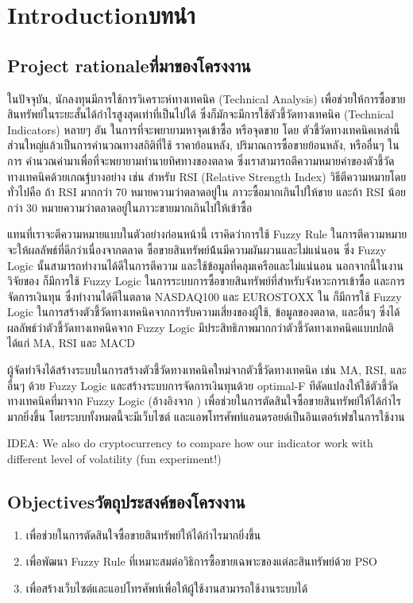 \chapter{\ifenglish Introduction\else บทนำ\fi}

\section{\ifenglish Project rationale\else ที่มาของโครงงาน\fi}
ในปัจจุบัน, นักลงทุนมีการใช้การวิเคราะห์ทางเทคนิค (Technical Analysis) เพื่อช่วยให้การซื้อขายสินทรัพย์ในระยะสั้นได้กำไรสูงสุดเท่าที่เป็นไปได้
ซึ่งก็มักจะมีการใช้ตัวชี้วัดทางเทคนิค (Technical Indicators) หลายๆ อัน ในการที่จะพยายามหาจุดเข้าซื้อ หรือจุดขาย โดย 
ตัวชี้วัดทางเทคนิคเหล่านี้ส่วนใหญ่แล้วเป็นการคำนวณทางสถิติที่ใช้ ราคาย้อนหลัง, ปริมาณการซื้อขายย้อนหลัง, หรืออื่นๆ ในการ
คำนวณค่ามาเพื่อที่จะพยายามทำนายทิศทางของตลาด ซึ่งเราสามารถตีความหมายค่าของตัวชี้วัดทางเทคนิคด้วยเกณฐ์บางอย่าง เช่น 
สำหรับ RSI (Relative Strength Index) วิธีตีความหมายโดยทั่วไปคือ ถ้า RSI มากกว่า 70 หมายความว่าตลาดอยู่ใน
ภาวะซื้อมากเกินไปให้ขาย และถ้า RSI น้อยกว่า 30 หมายความว่าตลาดอยู่ในภาวะขายมากเกินไปให้เข้าซื้อ

แทนที่เราจะตีความหมายแบบในตัวอย่างก่อนหน้านี้ เราคิดว่าการใช้ Fuzzy Rule ในการตีความหมายจะให้ผลลัพธ์ที่ดีกว่าเนื่องจากตลาด
ซื้อขายสินทรัพย์น้้นมีความผันผวนและไม่แน่นอน ซึ่ง Fuzzy Logic นั้นสามารถทำงานได้ดีในการตีความ และใช้ข้อมูลที่คลุมเครือและไม่แน่นอน
นอกจากนี้ในงานวิจัยของ \cite{Rodrigo} ก็มีการใช้ Fuzzy Logic ในการระบบการซื้อขายสินทรัพย์ที่สำหรับจังหวะการเข้าซื้อ
และการจัดการเงินทุน ซึ่งทำงานได้ดีในตลาด NASDAQ100 และ EUROSTOXX ใน \cite{Escobar} ก็มีการใช้ Fuzzy Logic
ในการสร้างตัวชี้วัดทางเทคนิคจากการรับความเสี่ยงของผู้ใช้, ข้อมูลของตลาด, และอื่นๆ ซึ่งได้ผลลัพธ์ว่าตัวชี้วัดทางเทคนิคจาก Fuzzy Logic
มีประสิทธิภาพมากกว่าตัวชี้วัดทางเทคนิคแบบปกติ ได้แก่ MA, RSI และ MACD

ผู้จัดทำจึงได้สร้างระบบในการสร้างตัวชี้วัดทางเทคนิคใหม่จากตัวชี้วัดทางเทคนิค เช่น MA, RSI, และอื่นๆ ด้วย Fuzzy Logic และสร้างระบบการจัดการเงินทุนด้วย
optimal-F ทีดัดแปลงให้ใช้ตัวชี้วัดทางเทคนิคที่มาจาก Fuzzy Logic (อ้างอิงจาก \cite{Rodrigo}) เพื่อช่วยในการตัดสินใจซื้อขายสินทรัพย์ให้ได้กำไรมากยิ่งขึ้น
โดยระบบทั้งหมดนี้จะมีเว็บไซต์ และแอพโทรศัพท์แอนดรอยด์เป็นอินเตอร์เฟซในการใช้งาน


IDEA: We also do cryptocurrency to compare how our indicator work with different level of volatility (fun experiment!)

\section{\ifenglish Objectives\else วัตถุประสงค์ของโครงงาน\fi}
\begin{enumerate}
    \item เพื่อช่วยในการตัดสินใจซื้อขายสินทรัพย์ให้ได้กำไรมากยิ่งขึ้น
    \item เพื่อพัฒนา Fuzzy Rule ที่เหมาะสมต่อวิธิการซื้อขายเฉพาะของแต่ละสินทรัพย์ด้วย PSO
    \item เพื่อสร้างเว็บไซต์และแอปโทรศัพท์เพื่อให้ผู้ใช้งานสามารถใช้งานระบบได้
\end{enumerate}

